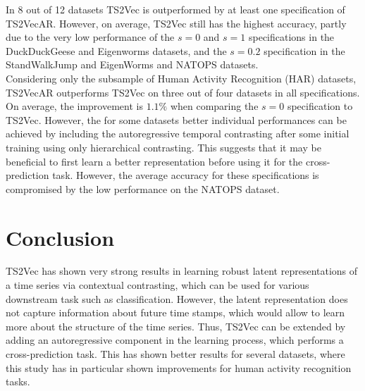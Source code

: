 \documentclass{article}
\begin{document}
In 8 out of 12 datasets TS2Vec is outperformed by at least one specification of TS2VecAR. However, on average, TS2Vec still has the highest accuracy, partly due to the very low performance of the  $s=0$ and $s=1$ specifications in the DuckDuckGeese and Eigenworms datasets, and the $s=0.2$ specification in the StandWalkJump and EigenWorms and NATOPS datasets. \\

Considering only the subsample of Human Activity Recognition (HAR) datasets, TS2VecAR outperforms TS2Vec on three out of four datasets in all specifications.  On average, the improvement is $1.1\%$ when comparing the $s=0$ specification to TS2Vec. However, the for some datasets better individual performances can be achieved by including the autoregressive temporal contrasting after some initial training using only hierarchical contrasting. This suggests that it may be beneficial to first learn a better representation before using it for the cross-prediction task. However, the average accuracy for these specifications is compromised by the low performance on the NATOPS dataset.

\section{Conclusion}

TS2Vec has shown very strong results in learning robust latent representations of a time series via contextual contrasting, which can be used for various downstream task such as classification. However, the latent representation does not capture information about future time stamps, which would allow to learn more about the structure of the time series. Thus, TS2Vec can be extended by adding an autoregressive component in the learning process, which performs a cross-prediction task. This has shown better results for several datasets, where this study has in particular shown improvements for human activity recognition tasks.

\newpage




\end{document}
